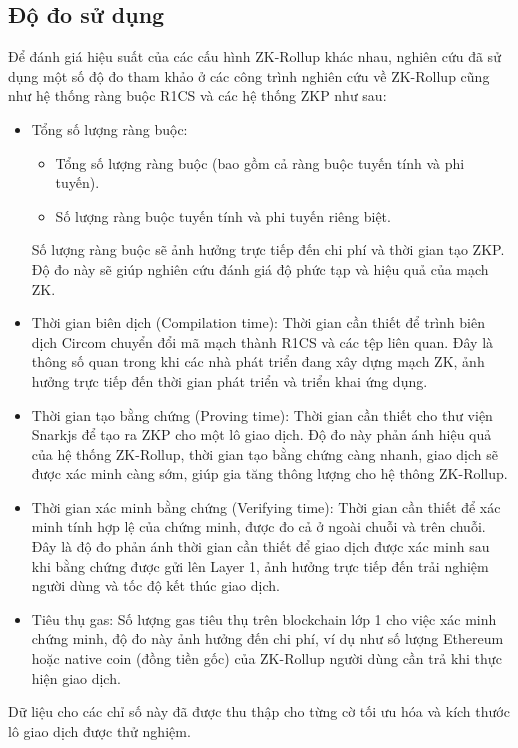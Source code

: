 \subsection{Độ đo sử dụng}
Để đánh giá hiệu suất của các cấu hình ZK-Rollup khác nhau, nghiên cứu đã sử dụng một số độ đo tham khảo ở các công trình nghiên cứu về ZK-Rollup \cite{chaliasos2024analyzing} cũng như hệ thống ràng buộc R1CS \cite{albert2022distilling} và các hệ thống ZKP \cite{el2024evaluating} như sau:
\begin{itemize}
    \item Tổng số lượng ràng buộc:
    \begin{itemize}
        \item Tổng số lượng ràng buộc (bao gồm cả ràng buộc tuyến tính và phi tuyến).
        \item Số lượng ràng buộc tuyến tính và phi tuyến riêng biệt.
    \end{itemize}
    Số lượng ràng buộc sẽ ảnh hưởng trực tiếp đến chi phí và thời gian tạo ZKP. Độ đo này sẽ giúp nghiên cứu đánh giá độ phức tạp và hiệu quả của mạch ZK.
    \item Thời gian biên dịch (Compilation time): Thời gian cần thiết để trình biên dịch Circom chuyển đổi mã mạch thành R1CS và các tệp liên quan. Đây là thông số quan trong khi các nhà phát triển đang xây dựng mạch ZK, ảnh hưởng trực tiếp đến thời gian phát triển và triển khai ứng dụng.
    \item Thời gian tạo bằng chứng (Proving time): Thời gian cần thiết cho thư viện Snarkjs để tạo ra ZKP cho một lô giao dịch. Độ đo này phản ánh hiệu quả của hệ thống ZK-Rollup, thời gian tạo bằng chứng càng nhanh, giao dịch sẽ được xác minh càng sớm, giúp gia tăng thông lượng cho hệ thông ZK-Rollup.
    \item Thời gian xác minh bằng chứng (Verifying time): Thời gian cần thiết để xác minh tính hợp lệ của chứng minh, được đo cả ở ngoài chuỗi và trên chuỗi. Đây là độ đo phản ánh thời gian cần thiết để giao dịch được xác minh sau khi bằng chứng được gửi lên Layer 1, ảnh hưởng trực tiếp đến trải nghiệm người dùng và tốc độ kết thúc giao dịch.
    \item Tiêu thụ gas: Số lượng gas tiêu thụ trên blockchain lớp 1 cho việc xác minh chứng minh, độ đo này ảnh hưởng đến chi phí, ví dụ như số lượng Ethereum hoặc native coin (đồng tiền gốc) của ZK-Rollup người dùng cần trả khi thực hiện giao dịch.
\end{itemize}

Dữ liệu cho các chỉ số này đã được thu thập cho từng cờ tối ưu hóa và kích thước lô giao dịch được thử nghiệm.

